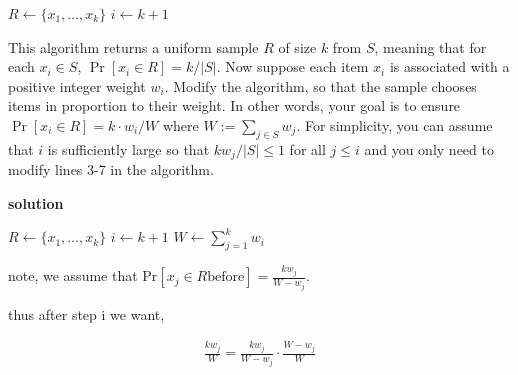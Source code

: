 \documentclass[letterpaper,12pt]{article}
\begin{document}
\begin{enumerate}
\begin{algorithm}
 $R \gets \{x_1, \dots, x_k\}$\;
 $i \gets k + 1$\;
 \;
 \caption{Reservoir Sampling (Algorithm R)}
\end{algorithm}

This algorithm returns a uniform sample $R$ of size $k$ from $S$, meaning that for each $x_i \in S$, $\Pr[x_i \in R] = k / |S|$. Now suppose each item $x_i$ is associated with a positive integer weight $w_i$. Modify the algorithm, so that the sample chooses items in proportion to their weight. In other words, your goal is to ensure
$\Pr[x_i \in R] = k \cdot w_i / W$ where $W := \sum_{j \in S} w_j$. For simplicity, you can assume that $i$ is sufficiently large so that $k w_j / |S| \leq 1$  for all $j \leq i$ and you only need to modify lines 3-7 in the algorithm. 

\textbf{solution}

\begin{algorithm}

 $R \gets \{x_1, \dots, x_k\}$\;
 $i \gets k + 1$\;
 \(W \gets \sum_{j=1}^{k}w_i\)\;


 \;
 \caption{Reservoir Weighted Sampling (Algorithm Weighted R)}
\end{algorithm}

note, we assume that \(\textrm{Pr}[x_j\in R \text{before}] = \frac{kw_j}{W-w_j}.\)

thus after step i we want, 

\begin{equation}\begin{split}
        \frac{kw_j}{W} = \frac{kw_j}{W-w_j} \cdot \frac{W-w_j}{W}
\end{split}
\end{equation}


\end{enumerate}
\end{document}
